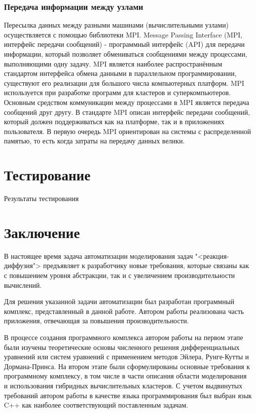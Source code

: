 \documentclass[a4paper, 14pt]{extarticle}
\theoremstyle{definition}
\begin{document}
\subsubsection{Передача информации между узлами}

\par Пересылка данных между разными машинами (вычислительными узлами) осуществляется с помощью библиотеки MPI. Message Passing Interface (MPI, интерфейс передачи сообщений) - программный интерфейс (API) для передачи информации, который позволяет обмениваться сообщениями между процессами, выполняющими одну задачу. MPI является наиболее распространённым стандартом интерфейса обмена данными в параллельном программировании, существуют его реализации для большого числа компьютерных платформ. MPI используется при разработке программ для кластеров и суперкомпьютеров. Основным средством коммуникации между процессами в MPI является передача сообщений друг другу. В стандарте MPI описан интерфейс передачи сообщений, который должен поддерживаться как на платформе, так и в приложениях пользователя. В первую очередь MPI ориентирован на системы с распределенной памятью, то есть когда затраты на передачу данных велики.





\section{Тестирование}
Результаты тестирования






\section*{Заключение}

\par В настоящее время задача автоматизации моделирования задач "<реакция-диффузия"> предъявляет к разработчику новые требования, которые связаны как с повышением уровня абстракции, так и с увеличением производительности вычислений.

\par Для решения указанной задачи автоматизации был разработан программный комплекс, представленный в данной работе. Автором работы реализована часть приложения, отвечающая за повышения производительности.

\par В процессе создания программного комплекса автором работы на первом этапе были изучены теоретические основы численного решения дифференциальных уравнений или систем уравнений с применением методов Эйлера, Рунге-Кутты и Дормана-Принса. На втором этапе были сформулированы основные требования к программному комплексу, в том числе в части описания области моделирования и использования гибридных вычислительных кластеров. С учетом выдвинутых требований автором работы в качестве языка программирования был выбран язык C++ как наиболее соответствующий поставленным задачам.
\end{document}
